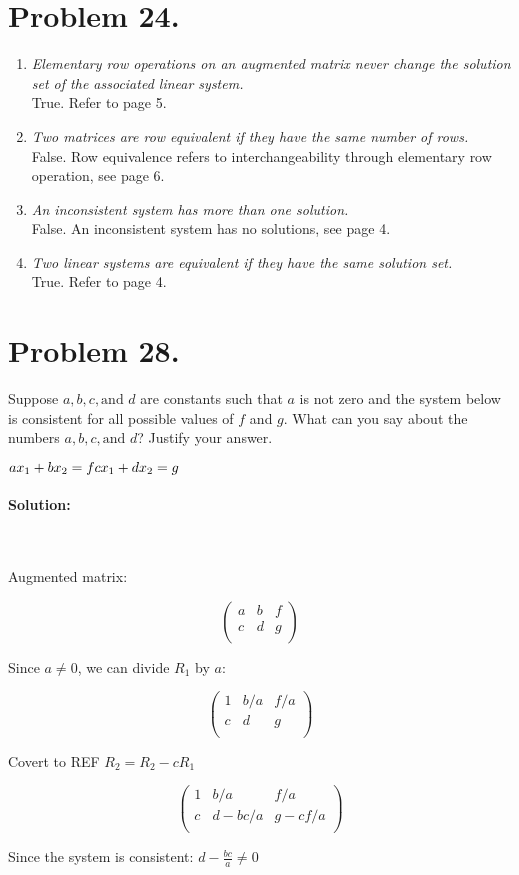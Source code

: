 \documentclass[11pt, notitlepage]{report}
\newenvironment{solution}{\paragraph{\small Solution:}}{\hfill}
\begin{document}
\newpage
\section{Problem 24.} 

\begin{enumerate}[label=(\alph*)]
	\item \textit{Elementary row operations on an augmented matrix never change the solution set of the associated linear system.}\\ True. Refer to page 5.

	\item \textit{Two matrices are row equivalent if they have the same number of rows.} \\ False. Row equivalence refers to interchangeability through elementary row operation, see page 6.

	\item \textit{An inconsistent system has more than one solution.} \\
     False. An inconsistent system has no solutions, see page 4.
	\item \textit{Two linear systems are equivalent if they have the same solution set.} \\ True. Refer to page 4.
\end{enumerate}

\section{Problem 28.}

Suppose $a, b, c, \text{and } d$ are constants such that $a$ is not zero and the system below is consistent for all possible values of $f$ and $g$. What can you say about the numbers $a, b, c, \text{and } d$? Justify your answer.

$ax_1 + bx_2 = f \\
 cx_1 + dx_2 = g $
 
 
 \begin{solution}\

 Augmented matrix:
 
 \[\left(\begin{matrix}{}
  a& b & f \\
  c& d & g \\
\end{matrix}\right)\]

Since $a \neq 0$, we can divide $R_1$ by $a$:

 \[\left(\begin{matrix}{}
  1& b/a & f/a \\
  c& d & g \\
\end{matrix}\right)\]

Covert to REF $R_2 = R_2 - cR_1$

 \[\left(\begin{matrix}{}
  1& b/a & f/a \\
  c& d-bc/a & g-cf/a \\
\end{matrix}\right)\]

Since the system is consistent: $d-\frac{bc}{a} \neq 0$
	
 \end{solution}
 
\end{document}
